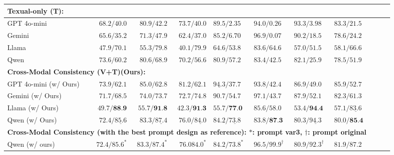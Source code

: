 \documentclass[10pt]{article} %
\begin{document}
\begin{table}[ht]
{\begin{tabular}{lrrrlllllll}
\multicolumn{8}{l}{\textbf{Texual-only (T):}} \\
\midrule
GPT 4o-mini & $68.2 / 40.0$ & $80.9 / 42.2$ & $73.7/40.0$ & $ 89.5 / 2.35 $ & $94.0/0.26 $ & $93.3/3.98 $ & $ 83.3/21.5 $ \\
Gemini & $65.6 / 35.2$ & $71.3 / 47.9$ & $ 62.4 / 37.0$ & $85.2 / 6.70$ & $ 96.9/0.07$ & $ 90.2/18.5$ & $ 78.6/24.2$ \\
Llama & $47.9 / 70.1$ & $55.3 / 79.8$ & $ 40.1 / 79.9 $ & $64.6 / 53.8$ & $83.6/64.6 $ & $ 57.0 / 51.5$ & $ 58.1 / 66.6$ \\
Qwen & $ 73.6 / 60.2$ & $80.6 / 68.9$ & $70.2 / 56.6$ & $80.9 / 57.2 $ & $ 83.4/42.5$ & $ 82.1 / 25.9$ & $78.5 / 51.9$ \\
\multicolumn{8}{l}{\textbf{Cross-Modal Consistency (V+T)(Ours):}} \\
\midrule
GPT 4o-mini (w/ Ours) & $73.9 / 62.1$ & $85.0 / 62.8$ & $81.2/62.1$ & $\underline{94.3} / 37.7$ & $93.8 / 42.4$ & $86.9 / 49.0$ & $85.9 / 52.7$\\
Gemini (w/ Ours) & $71.7 / 68.5$ & $74.0 / 73.7$ & $72.7 / 74.8$ & $90.7 / 54.7$ & $97.1 / 43.7$ & $87.9 / 52.1$ & $82.3 / 61.3$\\
Llama (w/ Ours) & $49.7 / \textbf{88.9}$ & $55.7 / \textbf{91.8}$ & $42.3 / \textbf{91.3}$ & $55.7 / \textbf{77.0}$ & $85.6 / 58.0$ & $53.4 / \textbf{94.4}$ & $57.1 / \underline{83.6}$\\
Qwen (w/ Ours) & $72.4 / \underline{85.6}$ & $83.3 / \underline{87.4}$ & $76.0 / \underline{84.0}$ & $84.2 / \underline{73.8}$ & $83.8 / \textbf{87.3}$ & $80.3 / \underline{94.3}$ & $80.0 / \textbf{85.4}$ \\
\multicolumn{8}{l}{\textbf{Cross-Modal Consistency (with the best prompt design as reference): $*$: prompt var3, $\dag$: prompt original}} \\
\midrule
Qwen (w/ ours) & $72.4 / 85.6^{*}$ & $83.3 / 87.4^{*}$ & $76.0 84.0^{*}$ & $84.2 / 73.8^{*}$ & $96.5 / 99.9^{\dag}$ & $80.9 / 92.3^{\dag}$ & $81.9/87.2$\\
\end{tabular}
}
\end{table}
\vspace{-2mm}
\end{document}
